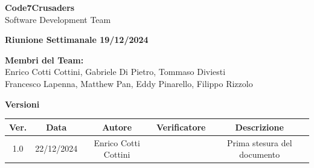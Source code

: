 \documentclass{article}
\begin{document}
\begin{titlepage}
    {\Huge \textbf{Code7Crusaders}}\\
    \vspace{0.5cm}
    {\Large Software Development Team}\\
    \vspace{2cm}
        
        {\large \textbf{Riunione Settimanale 19/12/2024}}\\
    \vspace{5cm}                           %
    
    
    \textbf{Membri del Team:}\\
    Enrico Cotti Cottini, Gabriele Di Pietro, Tommaso Diviesti \\
    Francesco Lapenna, Matthew Pan, Eddy Pinarello, Filippo Rizzolo \\
    \vspace{0.5cm}
    
    \vspace{1cm}
\end{titlepage}



\newpage
\begin{table}[h!]
\centering
\textbf{Versioni} \\ %
\vspace{2mm} %
\begin{tabular}{|c|c|c|c|c|}
    \hline
    \textbf{Ver.} & \textbf{Data} & \textbf{Autore} & \textbf{Verificatore} & \textbf{Descrizione} \\
    \hline
    1.0 & 22/12/2024 & Enrico Cotti Cottini &  & Prima stesura del documento \\ 
    \hline                                  %
\end{tabular}
\end{table}



\newpage
\tableofcontents
\end{document}
